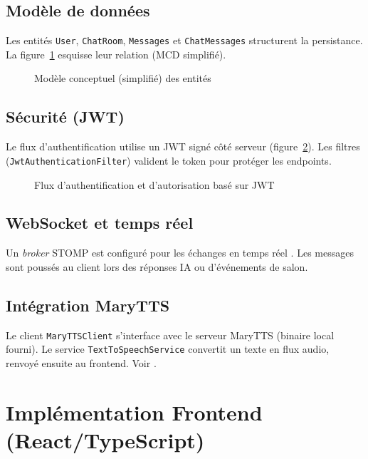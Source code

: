 \documentclass[12pt,a4paper]{report}
\begin{document}
\section{Modèle de données}
Les entités \texttt{User}, \texttt{ChatRoom}, \texttt{Messages} et \texttt{ChatMessages} structurent la persistance. La figure~\ref{fig:mcd} esquisse leur relation (MCD simplifié).

\begin{figure}[H]
  \centering
  
  \caption{Modèle conceptuel (simplifié) des entités}
  \label{fig:mcd}
\end{figure}

\section{Sécurité (JWT)}
Le flux d'authentification utilise un \ac{JWT} signé côté serveur (figure~\ref{fig:jwt-flux}). Les filtres (\texttt{JwtAuthenticationFilter}) valident le token pour protéger les endpoints.

\begin{figure}[H]
  \centering
  
  \caption{Flux d'authentification et d'autorisation basé sur JWT \cite{rfc7519}}
  \label{fig:jwt-flux}
\end{figure}

\section{WebSocket et temps réel}
Un \emph{broker} STOMP est configuré pour les échanges en temps réel \cite{spring-websocket}. Les messages sont poussés au client lors des réponses IA ou d'événements de salon.

\section{Intégration MaryTTS}
Le client \texttt{MaryTTSClient} s'interface avec le serveur MaryTTS (binaire local fourni). Le service \texttt{TextToSpeechService} convertit un texte en flux audio, renvoyé ensuite au frontend. Voir \cite{marytts}.

\chapter{Implémentation Frontend (React/TypeScript)}
\end{document}
